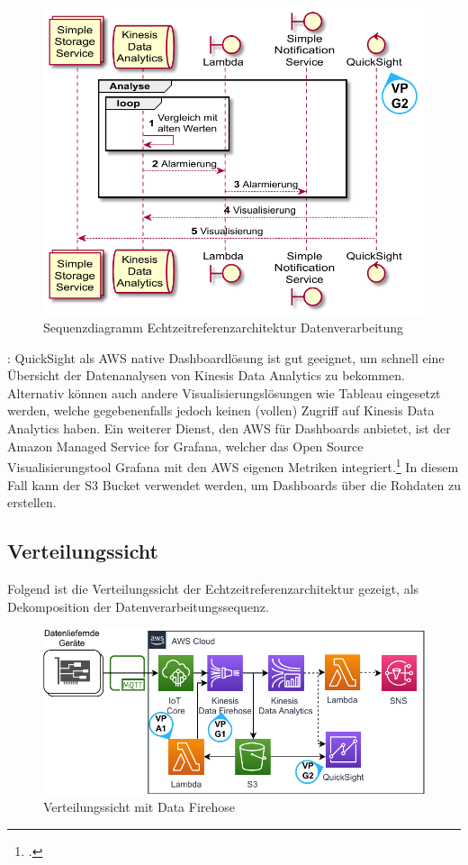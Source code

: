 \begin{figure}[H]
\centering
\includegraphics[height=0.43\textheight]{graphics/echtzeit-ra-analysis.pdf}
\caption{Sequenzdiagramm Echtzeitreferenzarchitektur Datenverarbeitung}
\label{abb:SequenceEchtzeitRAAnalysis}
\end{figure}

: QuickSight als \ac{AWS} native Dashboardlösung ist gut geeignet, um schnell eine Übersicht der Datenanalysen von Kinesis Data Analytics zu bekommen. Alternativ können auch andere Visualisierungslösungen wie Tableau eingesetzt werden, welche gegebenenfalls jedoch keinen (vollen) Zugriff auf Kinesis Data Analytics haben. Ein weiterer Dienst, den \ac{AWS} für Dashboards anbietet, ist der Amazon Managed Service for Grafana, welcher das Open Source Visualisierungstool Grafana mit den \ac{AWS} eigenen Metriken integriert.\footcite[Vgl.][]{Dutt.2020} In diesem Fall kann der \ac{S3} Bucket verwendet werden, um Dashboards über die Rohdaten zu erstellen. 

\subsection{Verteilungssicht}\label{subsection:Verteilungssich-E}
Folgend ist die Verteilungssicht der Echtzeitreferenzarchitektur gezeigt, als Dekomposition der Datenverarbeitungssequenz.
\begin{figure}[H]
\centering
\includegraphics[width=\textwidth]{graphics/Echtzeit-RA-Overview-Firehose}
\caption{Verteilungssicht mit Data Firehose}
\label{abb:TopLevelEchtzeitRA}
\end{figure}

